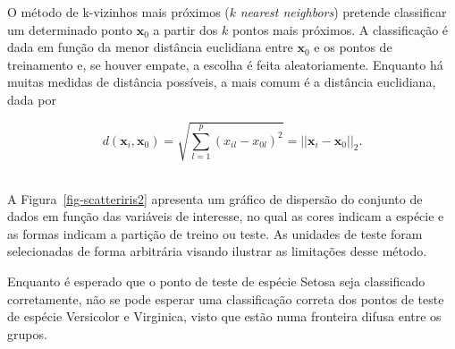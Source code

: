\documentclass[
  a4paperpaper,
]{article}
\newenvironment{Shaded}{\begin{snugshade}}{\end{snugshade}}
\newcommand{\AttributeTok}[1]{\textcolor[rgb]{0.40,0.45,0.13}{#1}}
\newcommand{\CommentTok}[1]{\textcolor[rgb]{0.37,0.37,0.37}{#1}}
\newcommand{\DecValTok}[1]{\textcolor[rgb]{0.68,0.00,0.00}{#1}}
\newcommand{\FunctionTok}[1]{\textcolor[rgb]{0.28,0.35,0.67}{#1}}
\newcommand{\NormalTok}[1]{\textcolor[rgb]{0.00,0.23,0.31}{#1}}
\newcommand{\SpecialCharTok}[1]{\textcolor[rgb]{0.37,0.37,0.37}{#1}}
\newcommand{\StringTok}[1]{\textcolor[rgb]{0.13,0.47,0.30}{#1}}
\begin{document}
O método de k-vizinhos mais próximos (\(k\) \emph{nearest neighbors})
pretende classificar um determinado ponto \(\mathbf{x}_0\) a partir dos
\(k\) pontos mais próximos. A classificação é dada em função da menor
distância euclidiana entre \(\mathbf{x}_0\) e os pontos de treinamento
e, se houver empate, a escolha é feita aleatoriamente. Enquanto há
muitas medidas de distância possíveis, a mais comum é a distância
euclidiana, dada por

\[
d(\mathbf{x}_i, \mathbf{x}_0) = \sqrt{ \sum_{l=1}^p (x_{il} - x_{0l})^2 } = ||\mathbf{x}_i - \mathbf{x}_0||_2.
\] ~

A Figura~\ref{fig-scatteriris2} apresenta um gráfico de dispersão do
conjunto de dados em função das variáveis de interesse, no qual as cores
indicam a espécie e as formas indicam a partição de treino ou teste. As
unidades de teste foram selecionadas de forma arbitrária visando
ilustrar as limitações desse método.

Enquanto é esperado que o ponto de teste de espécie Setosa seja
classificado corretamente, não se pode esperar uma classificação correta
dos pontos de teste de espécie Versicolor e Virginica, visto que estão
numa fronteira difusa entre os grupos.

~

\begin{Shaded}
\end{Shaded}
\end{document}
